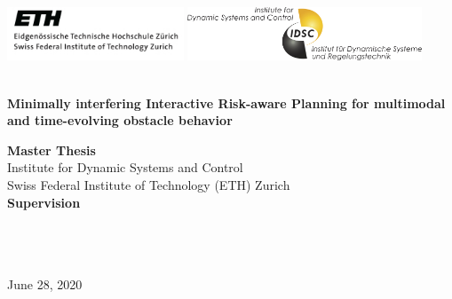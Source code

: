 \begin{titlepage}

\pagestyle{empty}
\begin{center}

\includegraphics[height=1.6cm]{logos/eth_logo}
\hfill
\includegraphics[height=1.6cm]{logos/idsc_logo}

\vspace*{2cm}
{\large \theauthor}
\vspace{2.5cm}

\begin{minipage}{15cm}
\centering
\bfseries \Huge {\thetitle} 
\\\vspace*{1cm}\Large {Minimally interfering Interactive Risk-aware Planning for multimodal and time-evolving obstacle behavior}
\end{minipage}
\vspace*{4cm}


{\large \textbf{Master Thesis}} \\[3ex]
Institute for Dynamic Systems and Control\\
Swiss Federal Institute of Technology (ETH) Zurich\\

\vspace{2cm}
\textbf{Supervision} \\[1.5ex]
\phdA \\
\phdB \\ 
\supervisorstanford \\ 
\supervisoreth

\vfill
June 28, 2020

\end{center}

\cleardoublepage %
\end{titlepage}

